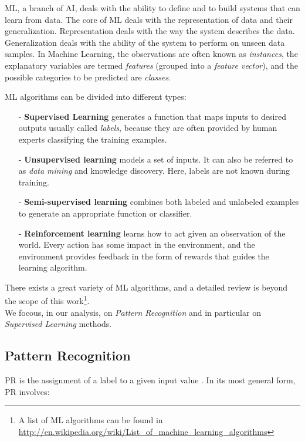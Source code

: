 \Gls{ML}, a branch of \Gls{AI}, deals with the ability to define and to build systems that can learn from data.
The core of \Gls{ML} deals with the representation of data and their generalization. Representation deals with the way the system describes the data.
Generalization deals with the ability of the system to perform on unseen data samples.
In Machine Learning, the observations are often known as \textit{instances},
the explanatory variables are termed \textit{features} (grouped into a \textit{feature vector}), and the possible categories to be predicted are \textit{classes}. 


\Gls{ML} algorithms can be divided into different types:
\begin{itemize} 
 \item [-] \textbf{Supervised Learning} generates a function that maps inputs to desired outputs usually called \textit{labels},
	because they are often provided by human experts classifying the training examples.
 \item [-] \textbf{Unsupervised learning} models a set of inputs. It can also be referred to as \textit{data mining} and knowledge discovery. Here, labels are not known during training.
 \item [-] \textbf{Semi-supervised learning} combines both labeled and unlabeled examples to generate an appropriate function or classifier. 
 \item [-] \textbf{Reinforcement learning} learns how to act given an observation of the world. Every action has some impact in the environment, and the environment provides feedback in the form of rewards that guides the learning algorithm.
\end{itemize}

There exists a great variety of \Gls{ML} algorithms, and a detailed review is beyond the scope of this work\footnote{A list of \Gls{ML} algorithms can be found in
\url{http://en.wikipedia.org/wiki/List_of_machine_learning_algorithms}}.\\
We focous, in our analysis, on \textit{Pattern Recognition} and in particular on \textit{Supervised Learning} methods.

\subsection{Pattern Recognition}
\label{ch2:pr}
\Gls{PR} is the assignment of a label to a given input value \cite{bishop2006pattern, theodoridis2008pattern}. In its most general form, \Gls{PR} involves:

